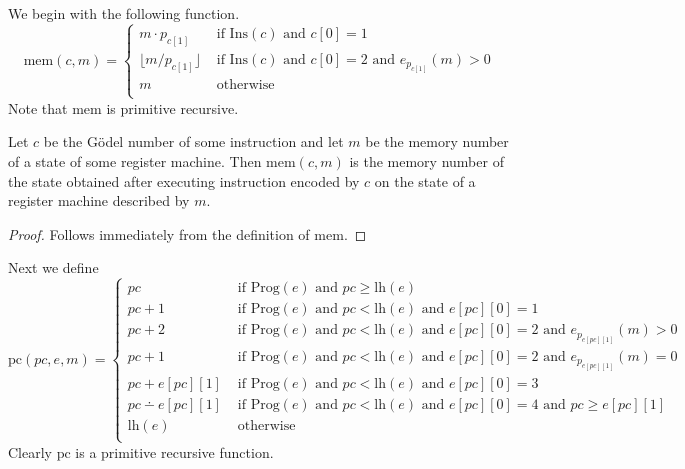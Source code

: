 \documentclass[10pt]{amsart}
\begin{document}
We begin with the following function.
$$\mathrm{mem}(c, m) = \begin{cases}
		m\cdot p_{c[1]}            & \mbox{ if }
		\mathrm{Ins}(c)\mbox{ and }c[0] = 1
		\\
		\lfloor m /p_{c[1]}\rfloor & \mbox{ if }\mathrm{Ins}(c)\mbox{ and }c[0] = 2\mbox{ and }e_{p_{c[1]}}(m) > 0 \\
		m                          & \mbox{ otherwise }                                                            \\
	\end{cases}$$
Note that $\mathrm{mem}$ is primitive recursive.

\begin{proposition}\label{proposition:memory_function}
	Let $c$ be the G{\"o}del number of some instruction and let $m$ be the memory number of a state of some register machine. Then $\mathrm{mem}(c,m)$ is the memory number of the state obtained after executing instruction encoded by $c$ on the state of a register machine described by $m$.
\end{proposition}
\begin{proof}
	Follows immediately from the definition of $\mathrm{mem}$.
\end{proof}
\noindent
Next we define
$$\mathrm{pc}(pc, e, m) = \begin{cases}
		pc                    & \mbox{ if }\mathrm{Prog}(e)\mbox{ and }pc \geq \mathrm{lh}(e)                                                         \\
		pc + 1                & \mbox{ if }
		\mathrm{Prog}(e)\mbox{ and }pc < \mathrm{lh}(e)\mbox{ and }e[pc][0] = 1
		\\
		pc + 2                & \mbox{ if }\mathrm{Prog}(e)\mbox{ and }pc < \mathrm{lh}(e)\mbox{ and }e[pc][0] = 2\mbox{ and }e_{p_{e[pc][1]}}(m) > 0 \\
		pc + 1                & \mbox{ if }\mathrm{Prog}(e)\mbox{ and }pc < \mathrm{lh}(e)\mbox{ and }e[pc][0] = 2\mbox{ and }e_{p_{e[pc][1]}}(m) = 0 \\
		pc + e[pc][1]         & \mbox{ if }\mathrm{Prog}(e)\mbox{ and }pc < \mathrm{lh}(e)\mbox{ and }e[pc][0] = 3                                    \\
		pc \dotminus e[pc][1] & \mbox{ if }\mathrm{Prog}(e)\mbox{ and }pc < \mathrm{lh}(e)\mbox{ and }e[pc][0] = 4\mbox{ and }pc \geq e[pc][1]        \\
		\mathrm{lh}(e)        & \mbox{ otherwise }                                                                                                    \\
	\end{cases}$$
Clearly $\mathrm{pc}$ is a primitive recursive function.
\end{document}
